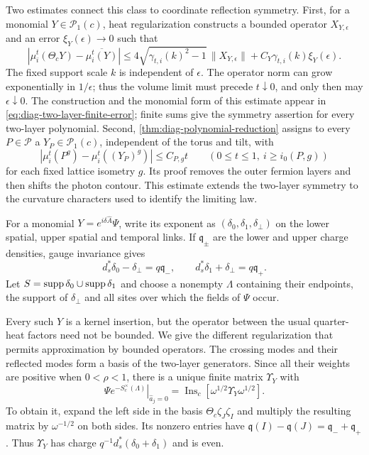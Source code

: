 Two estimates connect this class to coordinate reflection symmetry.
First, for a monomial $Y\in\mathcal P_1(c)$, heat regularization constructs a
bounded operator $X_{Y,\epsilon}$ and an error
$\xi_Y(\epsilon)\to0$ such that
\[
 |\mu_i^t(\Theta_cY)-\overline{\mu_i^t(Y)}|
 \le4\sqrt{\gamma_{t,i}(k)^2-1}\,\|X_{Y,\epsilon}\|
       +C_Y\gamma_{t,i}(k)\xi_Y(\epsilon).
\]
The fixed support scale $k$ is independent of $\epsilon$.
The operator norm can grow exponentially in $1/\epsilon$; thus the
volume limit must precede $t\downarrow0$, and only then may
$\epsilon\downarrow0$. The construction and the monomial form of
this estimate appear in \eqref{eq:diag-two-layer-finite-error};
finite sums give the symmetry assertion for every two-layer polynomial.
Second, \cref{thm:diag-polynomial-reduction} assigns to every
$P\in\mathcal P$ a $Y_P\in\mathcal P_1(c)$, independent of the
torus and tilt, with
\[
 |\mu_i^t(P^g)-\mu_i^t((Y_P)^g)|\le C_{P,g}t
 \qquad(0\le t\le1,\ i\ge i_0(P,g))
\]
for each fixed lattice isometry $g$. Its proof removes the outer
fermion layers and then shifts the photon contour. This estimate
extends the two-layer symmetry to the curvature characters used
to identify the limiting law.

For a monomial
$Y=e^{i\delta\widehat A}\Psi$, write its exponent as
$(\delta_0,\delta_1,\delta_\perp)$ on the lower spatial, upper
spatial and temporal links. If $\mathfrak q_\pm$ are the lower
and upper charge densities, gauge invariance gives
\begin{equation}\label{eq:diag-two-layer-gauss}
 d_s^*\delta_0-\delta_\perp=q\mathfrak q_-,\qquad
 d_s^*\delta_1+\delta_\perp=q\mathfrak q_+.
\end{equation}
Let $S=\operatorname{supp}\delta_0\cup\operatorname{supp}\delta_1$ and choose a nonempty $\Lambda$
containing their endpoints, the support of $\delta_\perp$ and
all sites over which the fields of $\Psi$ occur.

Every such $Y$ is a kernel insertion, but the operator between
the usual quarter-heat factors need not be bounded. We give the
different regularization that permits approximation by bounded
operators. The crossing modes and their reflected modes form a
basis of the two-layer generators. Since all their weights are
positive when $0<\rho<1$, there is a unique finite matrix
$\Upsilon_Y$ with
\begin{equation}\label{eq:diag-two-layer-matrix}
 \left.\Psi e^{-S_c^\times(\Lambda)}\right|_{\widehat a_j=0}
       =\operatorname{Ins}_c[
                      \omega^{1/2}\Upsilon_Y\omega^{1/2}].
\end{equation}
To obtain it, expand the left side in the basis
$\Theta_c\zeta_J\zeta_I$ and multiply the resulting matrix by
$\omega^{-1/2}$ on both sides. Its nonzero entries have
$\mathfrak q(I)-\mathfrak q(J)=\mathfrak q_-+\mathfrak q_+$.
Thus $\Upsilon_Y$ has charge
$q^{-1}d_s^*(\delta_0+\delta_1)$ and is even.

